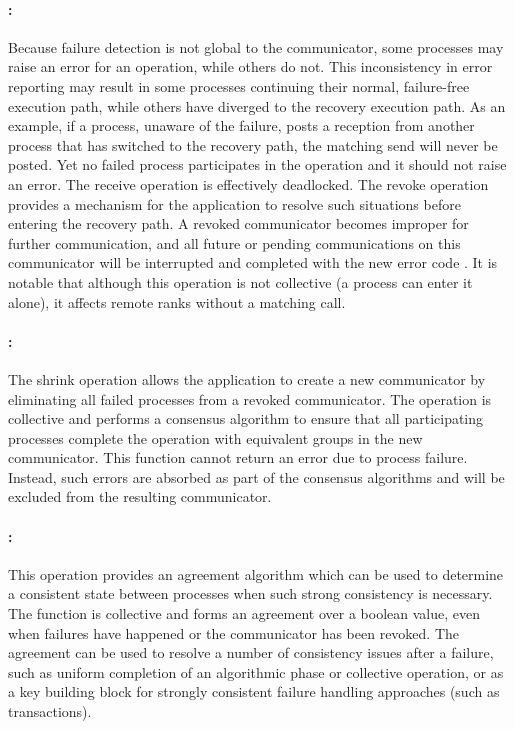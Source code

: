 \paragraph{:}

Because failure detection is not global to the communicator, some
processes may raise an error for an operation, while others do not. This
inconsistency in error reporting may result in some processes continuing
their normal, failure-free execution path, while others have diverged to
the recovery execution path. As an example, if a process, unaware of the
failure, posts a reception from another process that has switched to the
recovery path, the matching send will never be posted. Yet no failed 
process participates in the operation and it should
not raise an error. The receive operation is effectively deadlocked.
The revoke operation provides a mechanism for the application to resolve such
situations before entering the recovery path. A revoked communicator becomes
improper for further communication, and all future or pending communications on
this communicator will be interrupted and completed with the new error code
. It is notable that although this operation is not
collective (a process can enter it alone), it affects remote ranks without a
matching call.

\paragraph{:}

The shrink operation allows the application to create a new communicator by
eliminating all failed processes from a revoked communicator. The operation is
collective and performs a consensus algorithm to ensure that all participating
processes complete the operation with equivalent groups in the new communicator.
This function cannot return an error due to process failure. Instead, such errors
are absorbed as part of the consensus algorithms and will be excluded from the
resulting communicator.

\paragraph{:}

This operation provides an agreement algorithm which can be used to determine a
consistent state between processes when such strong consistency is
necessary. The function is collective and forms an agreement over a boolean
value, even when failures have happened or the communicator has been
revoked. The agreement can be used to resolve a number of consistency issues
after a failure, such as uniform completion of an algorithmic phase or
collective operation, or as a key building block for strongly consistent failure
handling approaches (such as transactions).
